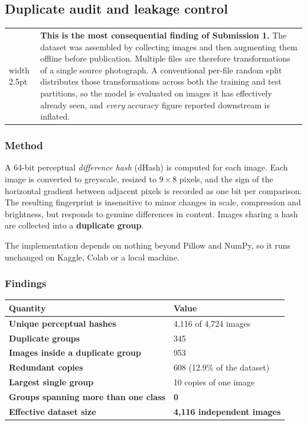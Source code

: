 \documentclass[11pt,a4paper]{article}
\makeatletter
\newenvironment{warnbox}
  {\par\medskip\noindent\begin{tabular}{@{}p{0.3em}@{\hspace{0.8em}}p{\dimexpr\linewidth-2.2em}@{}}
   {\color{warn}\vrule width 2.5pt} &}
  {\end{tabular}\par\medskip}
\makeatother
\begin{document}
\subsection{Duplicate audit and leakage control}
\label{sec:dupaudit}

\begin{warnbox}
\textbf{This is the most consequential finding of Submission 1.} The dataset was
assembled by collecting images and then augmenting them offline before publication.
Multiple files are therefore transformations of a single source photograph. A
conventional per-file random split distributes those transformations across both the
training and test partitions, so the model is evaluated on images it has effectively
already seen, and \emph{every} accuracy figure reported downstream is inflated.
\end{warnbox}

\subsubsection{Method}

A 64-bit perceptual \emph{difference hash} (dHash) is computed for each image. Each
image is converted to greyscale, resized to $9 \times 8$ pixels, and the sign of the
horizontal gradient between adjacent pixels is recorded as one bit per comparison. The
resulting fingerprint is insensitive to minor changes in scale, compression and
brightness, but responds to genuine differences in content. Images sharing a hash are
collected into a \textbf{duplicate group}.

The implementation depends on nothing beyond Pillow and NumPy, so it runs unchanged on
Kaggle, Colab or a local machine.

\subsubsection{Findings}

\begin{tabularx}{\linewidth}{@{}>{\bfseries}p{7.0cm}X@{}}
\toprule
Quantity & Value \\
\midrule
Unique perceptual hashes & 4{,}116 of 4{,}724 images \\
Duplicate groups & 345 \\
Images inside a duplicate group & 953 \\
Redundant copies & 608 \quad (12.9\% of the dataset) \\
Largest single group & 10 copies of one image \\
Groups spanning more than one class & \textbf{0} \\
\textbf{Effective dataset size} & \textbf{4{,}116 independent images} \\
\bottomrule
\end{tabularx}
\end{document}

